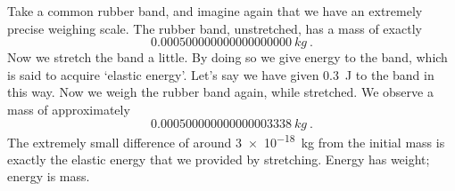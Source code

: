 \documentclass[a4paper,12pt,%
onecolumn,oneside,%
british%
]{memoir}
\renewcommand*{\|}[1][]{\nonscript\:#1\vert\nonscript\:\mathopen{}}
\begin{document}
%
%
Take a common rubber band, and imagine again that we have an extremely precise weighing scale. The rubber band, unstretched, has a mass of exactly
\begin{equation*}
  \qty{0.000500000000000000000}{kg}\ .
\end{equation*}
Now we stretch the band a little. By doing so we give energy to the band, which is said to acquire \enquote*{elastic energy}. Let's say we have given \qty{0.3}{J} to the band in this way.
Now we weigh the rubber band again, while stretched. We observe a mass of approximately
\begin{equation*}
  \qty{0.000500000000000003338}{kg} \ .
\end{equation*}
The extremely small difference of around \qty{3e-18}{kg} from the initial mass
is exactly the elastic energy that we provided by stretching.
Energy has weight; energy is mass.
\end{document}

